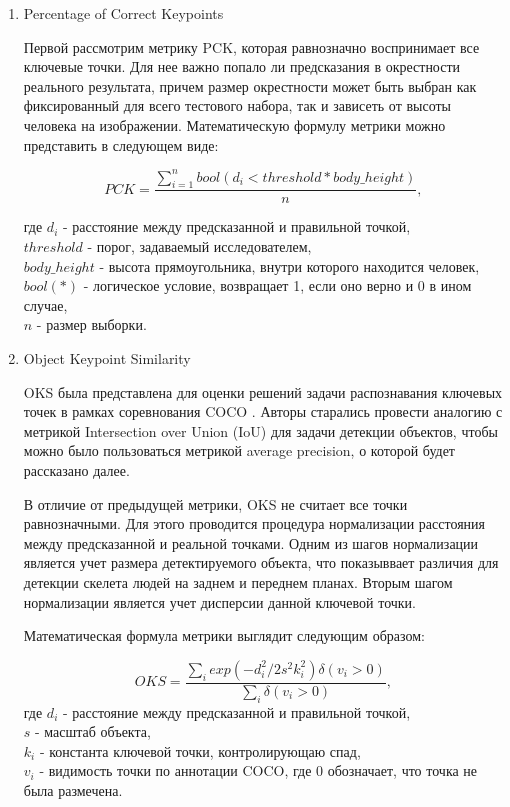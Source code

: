 \begin{enumerate}
\item Percentage of Correct Keypoints

Первой рассмотрим метрику PCK, которая равнозначно воспринимает все ключевые точки. Для нее важно попало ли предсказания в окрестности реального результата, причем размер окрестности может быть выбран как фиксированный для всего тестового набора, так и зависеть от высоты человека на изображении. Математическую формулу метрики можно представить в следующем виде:

\begin{equation}
	PCK = \frac{\sum_{i=1}^{n} bool(d_i < threshold * body\_height)}{n},
\end{equation}
	
где $d_i$ - расстояние между предсказанной и правильной точкой,\\
$threshold$ - порог, задаваемый исследователем,\\
$body\_height$ - высота прямоугольника, внутри которого находится человек,\\
$bool(*)$ - логическое условие, возвращает 1, если оно верно и 0 в ином случае,\\
$n$ - размер выборки.

\item Object Keypoint Similarity

OKS была представлена для оценки решений задачи распознавания ключевых точек в рамках соревнования COCO \cite{COCO_topology}. Авторы старались провести аналогию с метрикой Intersection over Union (IoU) для задачи детекции объектов, чтобы можно было пользоваться метрикой average precision, о которой будет рассказано далее.

В отличие от предыдущей метрики, OKS не считает все точки равнозначными. Для этого проводится процедура нормализации расстояния между предсказанной и реальной точками. Одним из шагов нормализации является учет размера детектируемого объекта, что показыввает различия для детекции скелета людей на заднем и переднем планах. Вторым шагом нормализации является учет дисперсии данной ключевой точки.

\hfill

Математическая формула метрики выглядит следующим образом:

\begin{equation}
	OKS = \frac{\sum_{i} exp\left( - d_i^2 / 2s^2k_i^2\right)\delta\left(v_i > 0\right)}{\sum_{i} \delta\left(v_i > 0\right)},
\end{equation}
где $d_i$ - расстояние между предсказанной и правильной точкой,\\
$s$ - масштаб объекта,\\
$k_i$ - константа ключевой точки, контролирующаю спад,\\
$v_i$ - видимость точки по аннотации COCO, где 0 обозначает, что точка не была размечена.


\end{enumerate}
